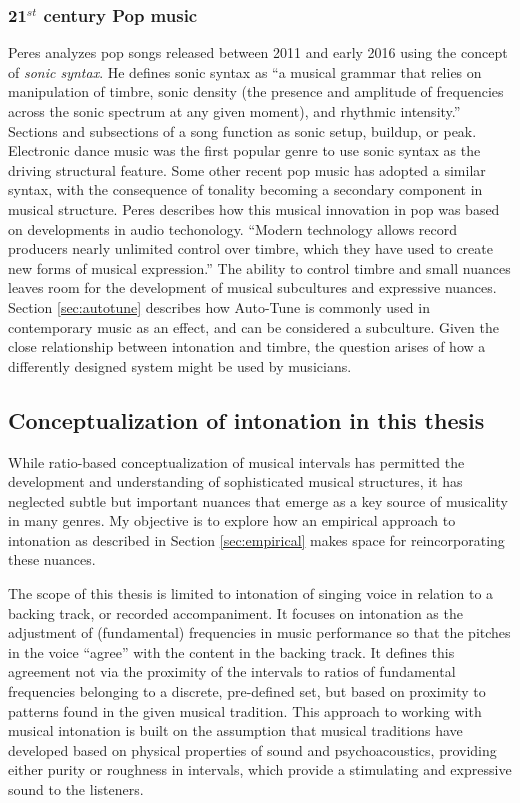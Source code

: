 \subsubsection{21$^{st}$ century Pop music}
Peres analyzes pop songs released between 2011 and early 2016 using the concept of \textit{sonic syntax}. He defines sonic syntax as ``a musical grammar that relies on manipulation of timbre, sonic
density (the presence and amplitude of frequencies across the sonic spectrum at any given
moment), and rhythmic intensity.'' \cite[][p.~2]{peres2016sonic} Sections and subsections of a song function as sonic setup, buildup, or peak. Electronic dance music was the first popular genre to use sonic syntax as the driving structural feature. Some other recent pop music has adopted a similar syntax, with the consequence of tonality becoming a secondary component in musical structure. Peres describes how this musical innovation in pop was based on developments in audio techonology. ``Modern technology allows record producers nearly unlimited control over timbre, which they have used to create new forms of musical expression.'' \cite[][p.~36]{peres2016sonic} The ability to control timbre and small nuances leaves room for the development of musical subcultures and expressive nuances. Section \ref{sec:autotune} describes how Auto-Tune is commonly used in contemporary music as an effect, and can be considered a subculture. Given the close relationship between intonation and timbre, the question arises of how a differently designed system might be used by musicians.

\subsection{Conceptualization of intonation in this thesis}

While ratio-based conceptualization of musical intervals has permitted the development and understanding of sophisticated musical structures, it has neglected subtle but important nuances that emerge as a key source of musicality in many genres. My objective is to explore how an empirical approach to intonation as described in Section \ref{sec:empirical} makes space for reincorporating these nuances. 

The scope of this thesis is limited to intonation of singing voice in relation to a backing track, or recorded accompaniment. It focuses on intonation as the adjustment of (fundamental) frequencies in music performance so that the pitches in the voice ``agree'' with the content in the backing track. It defines this agreement not via the proximity of the intervals to ratios of fundamental frequencies belonging to a discrete, pre-defined set, but based on proximity to patterns found in the given musical tradition. This approach to working with musical intonation is built on the assumption that musical traditions have developed based on physical properties of sound and psychoacoustics, providing either purity or roughness in intervals, which provide a stimulating and expressive sound to the listeners. 


